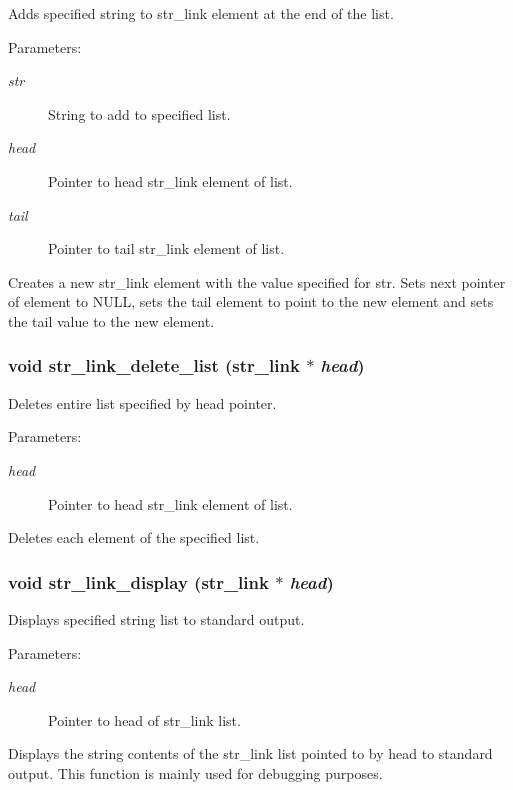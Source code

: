 Adds specified string to str\_\-link element at the end of the list.

\begin{Desc}
\item[Parameters: ]\par
\begin{description}
\item[{\em 
str}]String to add to specified list. \item[{\em 
head}]Pointer to head str\_\-link element of list. \item[{\em 
tail}]Pointer to tail str\_\-link element of list.\end{description}
\end{Desc}
Creates a new str\_\-link element with the value specified for str. Sets next pointer of element to NULL, sets the tail element to point to the new element and sets the tail value to the new element. 
\subsubsection{\setlength{\rightskip}{0pt plus 5cm}void str\_\-link\_\-delete\_\-list ({\bf str\_\-link} $\ast$ {\em head})}\label{link_8c_a17}


Deletes entire list specified by head pointer.

\begin{Desc}
\item[Parameters: ]\par
\begin{description}
\item[{\em 
head}]Pointer to head str\_\-link element of list.\end{description}
\end{Desc}
Deletes each element of the specified list. 
\subsubsection{\setlength{\rightskip}{0pt plus 5cm}void str\_\-link\_\-display ({\bf str\_\-link} $\ast$ {\em head})}\label{link_8c_a6}


Displays specified string list to standard output.

\begin{Desc}
\item[Parameters: ]\par
\begin{description}
\item[{\em 
head}]Pointer to head of str\_\-link list.\end{description}
\end{Desc}
Displays the string contents of the str\_\-link list pointed to by head to standard output. This function is mainly used for debugging purposes. 
